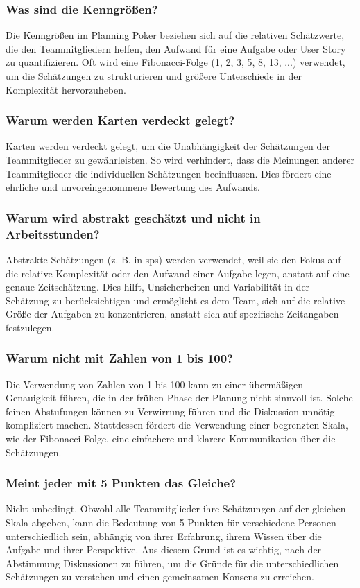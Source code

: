 \documentclass[main.tex]{subfiles}
\begin{document}
\subsubsection*{Was sind die Kenngrößen?}
Die Kenngrößen im \gls{Planning Poker} beziehen sich auf die relativen Schätzwerte, die den Teammitgliedern helfen, den Aufwand für eine Aufgabe oder \gls{User Story} zu quantifizieren. Oft wird eine Fibonacci-Folge (1, 2, 3, 5, 8, 13, ...) verwendet, um die Schätzungen zu strukturieren und größere Unterschiede in der Komplexität hervorzuheben.
\subsubsection*{Warum werden Karten verdeckt gelegt?}
Karten werden verdeckt gelegt, um die Unabhängigkeit der Schätzungen der Teammitglieder zu gewährleisten. So wird verhindert, dass die Meinungen anderer Teammitglieder die individuellen Schätzungen beeinflussen. Dies fördert eine ehrliche und unvoreingenommene Bewertung des Aufwands.
\subsubsection*{Warum wird abstrakt geschätzt und nicht in Arbeitsstunden?}
Abstrakte Schätzungen (z. B. in \glspl{sp}) werden verwendet, weil sie den Fokus auf die relative Komplexität oder den Aufwand einer Aufgabe legen, anstatt auf eine genaue Zeitschätzung. Dies hilft, Unsicherheiten und Variabilität in der Schätzung zu berücksichtigen und ermöglicht es dem Team, sich auf die relative Größe der Aufgaben zu konzentrieren, anstatt sich auf spezifische Zeitangaben festzulegen.
\subsubsection*{Warum nicht mit Zahlen von 1 bis 100?}
Die Verwendung von Zahlen von 1 bis 100 kann zu einer übermäßigen Genauigkeit führen, die in der frühen Phase der Planung nicht sinnvoll ist. Solche feinen Abstufungen können zu Verwirrung führen und die Diskussion unnötig kompliziert machen. Stattdessen fördert die Verwendung einer begrenzten Skala, wie der Fibonacci-Folge, eine einfachere und klarere Kommunikation über die Schätzungen.
\subsubsection*{Meint jeder mit 5 Punkten das Gleiche?}
Nicht unbedingt. Obwohl alle Teammitglieder ihre Schätzungen auf der gleichen Skala abgeben, kann die Bedeutung von 5 Punkten für verschiedene Personen unterschiedlich sein, abhängig von ihrer Erfahrung, ihrem Wissen über die Aufgabe und ihrer Perspektive. Aus diesem Grund ist es wichtig, nach der Abstimmung Diskussionen zu führen, um die Gründe für die unterschiedlichen Schätzungen zu verstehen und einen gemeinsamen Konsens zu erreichen. 
\end{document}
